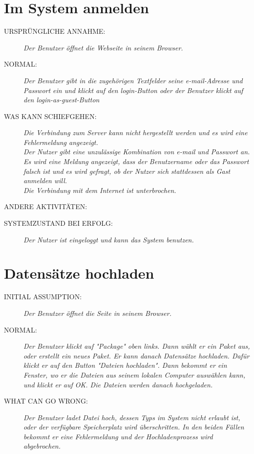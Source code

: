 

\section{Im System anmelden}
\begin{description}
  \item [URSPRÜNGLICHE ANNAHME:]
    \textit{Der Benutzer öffnet die Webseite in seinem Browser.}
  \item [NORMAL:]
    \textit{Der Benutzer gibt in die zugehörigen Textfelder seine e-mail-Adresse und Passwort ein und klickt auf den login-Button oder der Benutzer klickt auf den login-as-guest-Button}
  \item [WAS KANN SCHIEFGEHEN:]
    \textit{Die Verbindung zum Server kann nicht hergestellt werden und es wird eine Fehlermeldung angezeigt.\\ 
Der Nutzer gibt eine unzulässige Kombination von e-mail und Passwort an. Es wird eine Meldung angezeigt, dass der Benutzername oder das Passwort falsch ist und es wird gefragt, ob der Nutzer sich stattdessen als Gast anmelden will.\\
Die Verbindung mit dem Internet ist unterbrochen.
}
  \item [ANDERE AKTIVITÄTEN:]
    \textit{}
  \item [SYSTEMZUSTAND BEI ERFOLG:]
    \textit{Der Nutzer ist eingeloggt und kann das System benutzen.}
\end{description}


\section{Datensätze hochladen}
\begin{description}
  \item [INITIAL ASSUMPTION:]
    \textit{Der Benutzer öffnet die Seite in seinem Browser.}
  \item [NORMAL:]
    \textit{Der Benutzer klickt auf "Package" oben links. Dann wählt er ein Paket aus, oder erstellt ein neues Paket. Er kann danach Datensätze hochladen. Dafür klickt er auf den Button "Dateien hochladen". Dann bekommt er ein Fenster, wo er die Dateien aus seinem lokalen Computer auswählen kann, und klickt er auf OK. Die Dateien werden danach hochgeladen.}
  \item [WHAT CAN GO WRONG:]
    \textit{Der Benutzer ladet Datei hoch, dessen Typs im System nicht erlaubt ist, oder der verfügbare Speicherplatz wird überschritten. In den beiden Fällen bekommt er eine Fehlermeldung und der Hochladenprozess wird abgebrochen.
}
\end{description}


